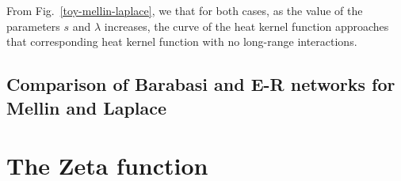 \documentclass[12pt]{article}
\begin{document}
From Fig.~\ref{toy-mellin-laplace}, we that for both cases, as the value of the parameters $s$ and $\lambda$ increases, the curve of the heat kernel function approaches that corresponding heat kernel function with no long-range interactions. 

\subsection{Comparison of Barabasi and E-R networks for Mellin and Laplace}



\section{The Zeta function }
\newpage

\renewcommand{\bibname}{References}
\nocite{*}


\end{document}
